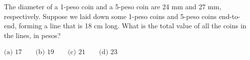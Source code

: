 The diameter of a 1-peso coin and a 5-peso coin are 24 mm and 27 mm, respectively. Suppose we laid down some 1-peso coins and 5-peso coins end-to-end, forming a line that is 18 cm long. What is the total value of all the coins in the lines, in pesos?



$\text{(a) }17\qquad\text{(b) }19\qquad\text{(c) }21\qquad\text{(d) }23$
